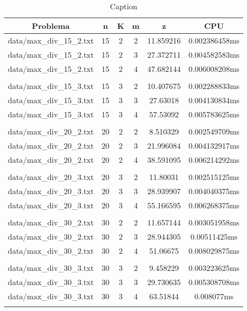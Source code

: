 \begin{table}[h]
\centering
\begin{tabular}{|c|c|c|c|c|c|}
\hline
Problema &  n &  K &  m &  z &  CPU \\
\hline
data/max\_div\_15\_2.txt &  15 &  2 &  2 &  11.859216 &  0.002386458ms \\
data/max\_div\_15\_2.txt &  15 &  2 &  3 &  27.372711 &  0.004582583ms \\
data/max\_div\_15\_2.txt &  15 &  2 &  4 &  47.682144 &  0.006008208ms \\
 \\
data/max\_div\_15\_3.txt &  15 &  3 &  2 &  10.407675 &  0.002288833ms \\
data/max\_div\_15\_3.txt &  15 &  3 &  3 &  27.63018 &  0.004130834ms \\
data/max\_div\_15\_3.txt &  15 &  3 &  4 &  57.53092 &  0.005783625ms \\
 \\
data/max\_div\_20\_2.txt &  20 &  2 &  2 &  8.510329 &  0.002549709ms \\
data/max\_div\_20\_2.txt &  20 &  2 &  3 &  21.996084 &  0.004132917ms \\
data/max\_div\_20\_2.txt &  20 &  2 &  4 &  38.591095 &  0.006214292ms \\
 \\
data/max\_div\_20\_3.txt &  20 &  3 &  2 &  11.80031 &  0.002515125ms \\
data/max\_div\_20\_3.txt &  20 &  3 &  3 &  28.939907 &  0.004040375ms \\
data/max\_div\_20\_3.txt &  20 &  3 &  4 &  55.166595 &  0.006268375ms \\
 \\
data/max\_div\_30\_2.txt &  30 &  2 &  2 &  11.657144 &  0.003051958ms \\
data/max\_div\_30\_2.txt &  30 &  2 &  3 &  28.944305 &  0.00511425ms \\
data/max\_div\_30\_2.txt &  30 &  2 &  4 &  51.06675 &  0.008029875ms \\
 \\
data/max\_div\_30\_3.txt &  30 &  3 &  2 &  9.458229 &  0.003223625ms \\
data/max\_div\_30\_3.txt &  30 &  3 &  3 &  29.730635 &  0.005308708ms \\
data/max\_div\_30\_3.txt &  30 &  3 &  4 &  63.51844 &  0.008077ms \\
 \\
\hline
\end{tabular}
\caption{Caption}
\label{tab:my_table}
\end{table}